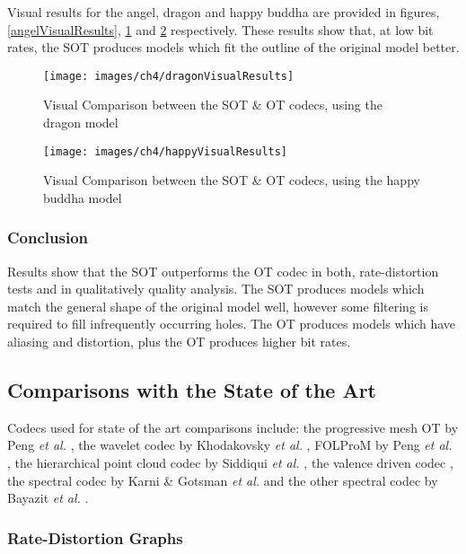 Visual results for the angel, dragon and happy buddha are provided in figures, \ref{angelVisualResults}, \ref{dragonVisualResults} and \ref{happyVisualResults} respectively. These results show that, at low bit rates, the SOT produces models which fit the outline of the original model better.

\begin{figure}[!h]
\centering
\texttt{[image: images/ch4/dragonVisualResults]}
\caption{Visual Comparison between the SOT \& OT codecs, using the dragon model}
\label{dragonVisualResults}
\end{figure}

\begin{figure}[!h]
\centering
\texttt{[image: images/ch4/happyVisualResults]}
\caption{Visual Comparison between the SOT \& OT codecs, using the happy buddha model}
\label{happyVisualResults}
\end{figure}

\subsubsection{Conclusion}

Results show that the SOT outperforms the OT codec in both, rate-distortion tests and in qualitatively quality analysis. The SOT produces models which match the general shape of the original model well, however some filtering is required to fill infrequently occurring holes. The OT produces models which have aliasing and distortion, plus the OT produces higher bit rates.

\subsection{Comparisons with the State of the Art}

Codecs used for state of the art comparisons include: the progressive mesh OT by Peng \textit{et al.} \cite{Peng05Geometry-Guided}, the wavelet codec by Khodakovsky \textit{et al.} \cite{Khodakovsky00Progressive}, FOLProM by Peng \textit{et al.} \cite{Peng10Feature}, the hierarchical point cloud codec by Siddiqui \textit{et al.} \cite{Siddiqui07Octree}, the valence driven codec \cite{touma98triangle}, the spectral codec by Karni \& Gotsman \textit{et al.} \cite{Karni00Spectral} and the other spectral codec by Bayazit \textit{et al.} \cite{Bayazit103DMesh}. 

\subsubsection{Rate-Distortion Graphs}

